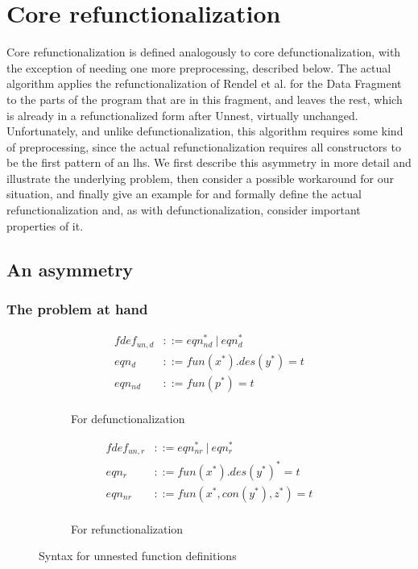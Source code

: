 \section{Core refunctionalization}

Core refunctionalization is defined analogously to core defunctionalization, with the exception of needing one more preprocessing, described below. The actual algorithm applies the refunctionalization of Rendel et al.\cite{rendel15automatic} for the Data Fragment to the parts of the program that are in this fragment, and leaves the rest, which is already in a refunctionalized form after \textsf{Unnest}, virtually unchanged. Unfortunately, and unlike defunctionalization, this algorithm requires some kind of preprocessing, since the actual refunctionalization requires all constructors to be the first pattern of an lhs. We first describe this asymmetry in more detail and illustrate the underlying problem, then consider a possible workaround for our situation, and finally give an example for and formally define the actual refunctionalization and, as with defunctionalization, consider important properties of it.

\subsection{An asymmetry}

\subsubsection{The problem at hand}
\label{sssec:asym}

\begin{figure}
\begin{subfigure}{0.5\textwidth}
\begin{align*}
fdef_{un,d} &::= eqn_{nd}^* ~ | ~ eqn_d^* \\
eqn_d &::= fun(x^*).des(y^*) = t \\
eqn_{nd} &::= fun(p^*) = t \\
\end{align*}
\caption{For defunctionalization}
\label{fig:unnfddefunc}
\end{subfigure}
\begin{subfigure}{0.5\textwidth}
\begin{align*}
fdef_{un,r} &::= eqn_{nr}^* ~ | ~ eqn_r^* \\
eqn_r &::= fun(x^*).des(y^*)^* = t \\
eqn_{nr} &::= fun(x^*, con(y^*), z^*) = t \\
\end{align*}
\caption{For refunctionalization}
\label{fig:unnfdrefunc}
\end{subfigure}
\caption{Syntax for unnested function definitions}
\end{figure}

